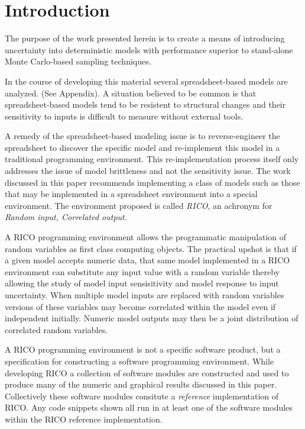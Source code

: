 \section{Introduction}

The purpose of the work presented herein is to create a means of introducing uncertainty into deterministic models with performance superior to stand-alone Monte Carlo-based sampling techniques.

In the course of developing this material several spreadsheet-based models are analyzed. (See Appendix). A situation believed to be common is that spreadsheet-based models tend to be resistent to structural changes and their sensitivity to inputs is difficult to measure without external tools. 

A remedy of the spreadsheet-based modeling issue is to reverse-engineer the spreadsheet to discover the specific model and re-implement this model in a traditional programming environment. This re-implementation process itself only addresses the issue of model brittleness and not the sensitivity issue. The work discussed in this paper recommends implementing a class of models such as those that may be implemented in a spreadsheet environment into a special environment. The environment proposed is called \emph{RICO}, an achronym for \emph{Random input, Correlated output}.

A RICO programming environment allows the programmatic manipulation of random variables as first class computing objects. The practical upshot is that if a given model accepts numeric data, that same model implemented in a RICO environment can substitute any input value with a random variable thereby allowing the study of model input sensisitivity and model response to input uncertainty. When multiple model inputs are replaced with random variables versions of these variables may become correlated within the model even if independent initially. Numeric model outputs may then be a joint distribution of correlated random variables. 

A RICO programming environment is not a specific software product, but a specification for constructing a software programming environment. While developing RICO a collection of software modules are constructed and used to produce many of the numeric and graphical results discussed in this paper. Collectively these software modules consitute a \emph{reference} implementation of RICO. Any code snippets shown all run in at least one of the software modules within the RICO reference implementation.

